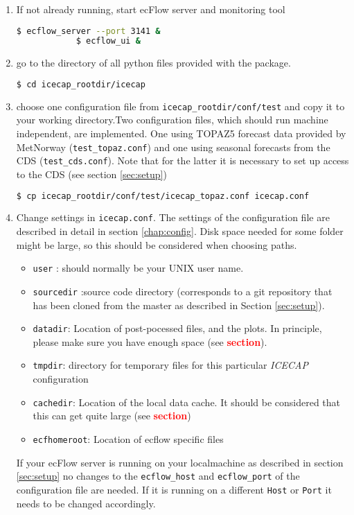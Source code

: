\documentclass[DIV=10, parskip=full]{scrreprt}
\newcommand{\ice}{\textit{ICECAP}\xspace}
\newcommand{\tbd}[1]{\textcolor{red}{\textbf{#1}}}
\begin{document}
\begin{enumerate}
	\item If not already running, start ecFlow server and monitoring tool 
		\begin{lstlisting}[language=bash, float]
			$ ecflow_server --port 3141 &
			$ ecflow_ui & 
		\end{lstlisting}
		
	\item go to the directory of all python files provided with the package.
	\begin{lstlisting}[language=bash, float]
		$ cd icecap_rootdir/icecap
	\end{lstlisting}
	
	\item choose one configuration file from \texttt{icecap\_rootdir/conf/test} and copy it to your working directory.Two configuration files, which should run machine independent, are implemented. One using TOPAZ5 forecast data provided by MetNorway (\texttt{test\_topaz.conf}) and one using seasonal forecasts from the CDS (\texttt{test\_cds.conf}). Note that for the latter it is necessary to set up access to the CDS (see section \ref{sec:setup})\\
	\begin{lstlisting}[language=bash, float]
		$ cp icecap_rootdir/conf/test/icecap_topaz.conf icecap.conf
	\end{lstlisting}
	
	\item Change settings in \texttt{icecap.conf}. The settings of the configuration file are described in detail in section \ref{chap:config}. Disk space needed for some folder might be large, so this should be considered when choosing paths.  
	\begin{itemize}
		\item \texttt{user} : should normally be your UNIX user name. 
		\item \texttt{sourcedir} :source code directory (corresponds to a git repository that has been cloned from the master as described in Section \ref{sec:setup}).
		\item \texttt{datadir}: Location of post-pocessed files, and the plots. In principle, please make sure you have enough space (see \tbd{section}). 
		\item \texttt{tmpdir}: directory for temporary files for this particular \ice configuration
		\item \texttt{cachedir}: Location of the local data cache. It should be considered that this can get quite large (see \tbd{section})
		\item \texttt{ecfhomeroot}: Location of ecflow specific files
	\end{itemize}
	If your ecFlow server is running on your localmachine as described in section \ref{sec:setup} no changes to the \texttt{ecflow\_host} and  \texttt{ecflow\_port} of the configuration file are needed. If it is running on a different \texttt{Host} or \texttt{Port} it needs to be changed accordingly.
	

\end{enumerate}
\end{document}
